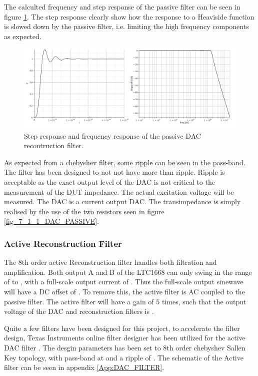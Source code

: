 The calculted frequency and step response of the passive filter can be seen in figure \ref{fig_7_1_1_DAC_PASSIVE_RESPONSE}. The step response clearly show how the response to a Heaviside function is slowed down by the passive filter, i.e. limiting the high frequency components as expected.

\begin{figure}[H]
    \centering
    \includegraphics[clip, trim=0 0 0 0, width=1\textwidth]{Sections/7_SystemDesign/Figures/7_1_1_DAC_PASSIVE_RESPONSE.pdf}
    \caption{Step response and frequency response of the passive DAC recontruction filter.}
    \label{fig_7_1_1_DAC_PASSIVE_RESPONSE}
\end{figure}

As expected from a chebyshev filter, some ripple can be seen in the pass-band. The filter has been designed to not not have more than  ripple. Ripple is acceptable as the exact output level of the DAC is not critical to the measurement of the DUT impedance. The actual excitation voltage will be measured. The DAC is a current output DAC. The transimpedance is simply realised by the use of the two  resistors seen in figure \ref{fig_7_1_1_DAC_PASSIVE}.

\subsubsection{Active Reconstruction Filter}
The 8th order active Reconstruction filter handles both filtration and amplification. Both output A and B of the LTC1668 can only swing in the range of  to , with a full-scale output current of . Thus the full-scale output sinewave will have a DC offset of . To remove this, the active filter is AC coupled to the passive filter. The active filter will have a gain of 5 times, such that the output voltage of the DAC and reconstruction filters is .

Quite a few filters have been designed for this project, to accelerate the filter design, Texas Instruments online filter designer has been utilized for the active DAC filter \cite{TI_FILTER_TOOL}. The desgin parameters has been set to 8th order chebyshev Sallen Key topology, with pass-band at  and a ripple of . The schematic of the Active filter can be seen in appendix \ref{App:DAC_FILTER}.

